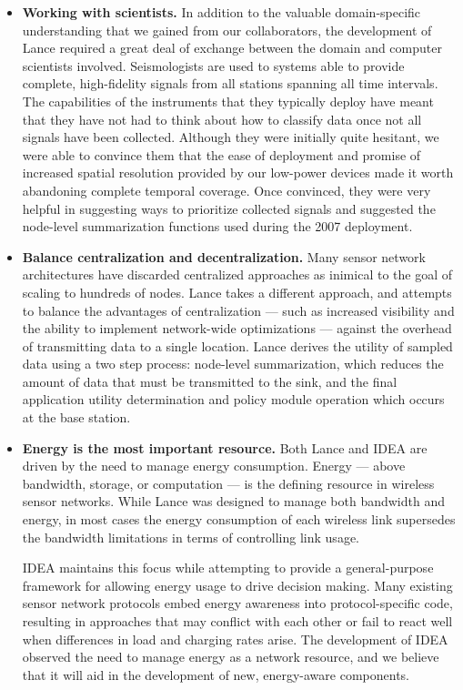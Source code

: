 \begin{itemize}

\item \textbf{Working with scientists.} In addition to the valuable
domain-specific understanding that we gained from our collaborators, the
development of Lance required a great deal of exchange between the domain and
computer scientists involved. Seismologists are used to systems able to
provide complete, high-fidelity signals from all stations spanning all time
intervals. The capabilities of the instruments that they typically deploy
have meant that they have not had to think about how to classify data once
not all signals have been collected. Although they were initially quite
hesitant, we were able to convince them that the ease of deployment and
promise of increased spatial resolution provided by our low-power devices
made it worth abandoning complete temporal coverage. Once convinced, they
were very helpful in suggesting ways to prioritize collected signals and
suggested the node-level summarization functions used during the 2007
deployment.

\item \textbf{Balance centralization and decentralization.} Many sensor
network architectures have discarded centralized approaches as inimical to
the goal of scaling to hundreds of nodes. Lance takes a different approach,
and attempts to balance the advantages of centralization --- such as
increased visibility and the ability to implement network-wide optimizations
--- against the overhead of transmitting data to a single location. Lance
derives the utility of sampled data using a two step process: node-level
summarization, which reduces the amount of data that must be transmitted to
the sink, and the final application utility determination and policy module
operation which occurs at the base station.

\item \textbf{Energy is the most important resource.} Both Lance and IDEA
are driven by the need to manage energy consumption. Energy --- above
bandwidth, storage, or computation --- is the defining resource in wireless
sensor networks. While Lance was designed to manage both bandwidth and
energy, in most cases the energy consumption of each wireless link supersedes
the bandwidth limitations in terms of controlling link usage.

IDEA maintains this focus while attempting to provide a general-purpose
framework for allowing energy usage to drive decision making. Many existing
sensor network protocols embed energy awareness into protocol-specific code,
resulting in approaches that may conflict with each other or fail to react
well when differences in load and charging rates arise. The development of
IDEA observed the need to manage energy as a network resource, and we believe
that it will aid in the development of new, energy-aware components.


\end{itemize}
